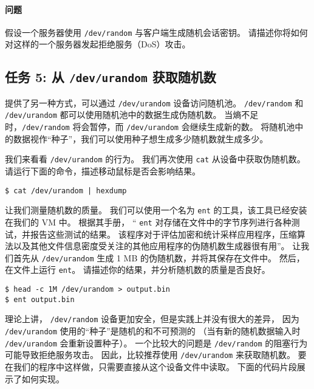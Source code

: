 \paragraph{问题}
假设一个服务器使用 \texttt{/dev/random} 与客户端生成随机会话密钥。
请描述你将如何对这样的一个服务器发起拒绝服务（DoS）攻击。



\subsection{任务 5: 从 {\tt /dev/urandom} 获取随机数}

{\linux} 提供了另一种方式，可以通过 {\tt /dev/urandom} 设备访问随机池。
{\tt /dev/random} 和 {\tt /dev/urandom} 都可以使用随机池中的数据生成伪随机数。
当熵不足时，{\tt /dev/random} 将会暂停，而 {\tt /dev/urandom} 会继续生成新的数。
将随机池中的数据视作“种子”，我们可以使用种子想生成多少随机数就生成多少。

我们来看看 \texttt{/dev/urandom} 的行为。
我们再次使用 \texttt{cat} 从设备中获取伪随机数。
请运行下面的命令，描述移动鼠标是否会影响结果。

\begin{lstlisting}
$ cat /dev/urandom | hexdump
\end{lstlisting}



让我们测量随机数的质量。
我们可以使用一个名为 \texttt{ent} 的工具，该工具已经安装在我们的 VM 中。
根据其手册， `` \texttt{ent} 对存储在文件中的字节序列进行各种测试，并报告这些测试的结果。
该程序对于评估加密和统计采样应用程序，压缩算法以及其他文件信息密度受关注的其他应用程序的伪随机数生成器很有用''。
让我们首先从 \texttt{/dev/urandom} 生成 1 MB 的伪随机数，并将其保存在文件中。
然后，在文件上运行 \texttt{ent}。
请描述你的结果，并分析随机数的质量是否良好。


\begin{lstlisting}
$ head -c 1M /dev/urandom > output.bin
$ ent output.bin
\end{lstlisting}




理论上讲， \texttt{/dev/random} 设备更加安全，但是实践上并没有很大的差异，
因为 \texttt{/dev/urandom} 使用的“种子”是随机的和不可预测的
（当有新的随机数据输入时 \texttt{/dev/urandom} 会重新设置种子）。
一个比较大的问题是 \texttt{/dev/random} 的阻塞行为可能导致拒绝服务攻击。
因此，比较推荐使用 \texttt{/dev/urandom} 来获取随机数。
要在我们的程序中这样做，只需要直接从这个设备文件中读取。
下面的代码片段展示了如何实现。


